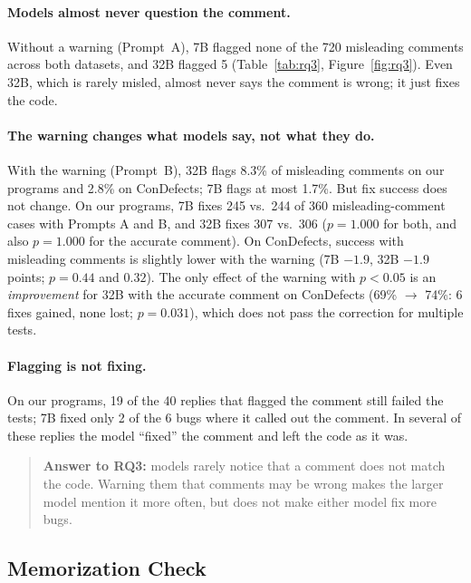 \documentclass[sigconf,nonacm]{acmart}
\newcommand{\cd}{ConDefects}
\begin{document}
\paragraph{Models almost never question the comment.} Without a warning (Prompt~A), 7B flagged none of the 720 misleading comments across both datasets, and 32B flagged 5 (Table~\ref{tab:rq3}, Figure~\ref{fig:rq3}). Even 32B, which is rarely misled, almost never says the comment is wrong; it just fixes the code.

\paragraph{The warning changes what models say, not what they do.} With the warning (Prompt~B), 32B flags 8.3\% of misleading comments on our programs and 2.8\% on \cd{}; 7B flags at most 1.7\%. But fix success does not change. On our programs, 7B fixes 245 vs.\ 244 of 360 misleading-comment cases with Prompts A and B, and 32B fixes 307 vs.\ 306 ($p = 1.000$ for both, and also $p = 1.000$ for the accurate comment). On \cd{}, success with misleading comments is slightly lower with the warning (7B $-1.9$, 32B $-1.9$ points; $p = 0.44$ and $0.32$). The only effect of the warning with $p < 0.05$ is an \emph{improvement} for 32B with the accurate comment on \cd{} (69\% $\to$ 74\%: 6 fixes gained, none lost; $p = 0.031$), which does not pass the correction for multiple tests.

\paragraph{Flagging is not fixing.} On our programs, 19 of the 40 replies that flagged the comment still failed the tests; 7B fixed only 2 of the 6 bugs where it called out the comment. In several of these replies the model ``fixed'' the comment and left the code as it was.

\begin{quote}
\textbf{Answer to RQ3:} models rarely notice that a comment does not match the code. Warning them that comments may be wrong makes the larger model mention it more often, but does not make either model fix more bugs.
\end{quote}

\subsection{Memorization Check}
\end{document}
